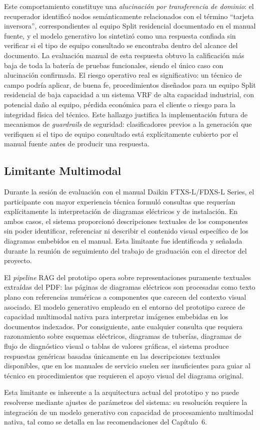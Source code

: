 {{Este comportamiento constituye una \textit{alucinación por transferencia de dominio}: el recuperador identificó nodos semánticamente relacionados con el término ``tarjeta inversora'', correspondientes al equipo Split residencial documentado en el manual fuente, y el modelo generativo los sintetizó como una respuesta confiada sin verificar si el tipo de equipo consultado se encontraba dentro del alcance del documento. La evaluación manual de esta respuesta obtuvo la calificación más baja de toda la batería de pruebas funcionales, siendo el único caso con alucinación confirmada. El riesgo operativo real es significativo: un técnico de campo podría aplicar, de buena fe, procedimientos diseñados para un equipo Split residencial de baja capacidad a un sistema VRF de alta capacidad industrial, con potencial daño al equipo, pérdida económica para el cliente o riesgo para la integridad física del técnico. Este hallazgo justifica la implementación futura de mecanismos de \textit{guardrails} de seguridad: clasificadores previos a la generación que verifiquen si el tipo de equipo consultado está explícitamente cubierto por el manual fuente antes de producir una respuesta.

\subsection{Limitante Multimodal}
\label{sec:limitante_multimodal}

Durante la sesión de evaluación con el manual Daikin FTXS-L/FDXS-L Series, el participante con mayor experiencia técnica formuló consultas que requerían explícitamente la interpretación de diagramas eléctricos y de instalación. En ambos casos, el sistema proporcionó descripciones textuales de los componentes sin poder identificar, referenciar ni describir el contenido visual específico de los diagramas embebidos en el manual. Esta limitante fue identificada y señalada durante la reunión de seguimiento del trabajo de graduación con el director del proyecto.

El \textit{pipeline} RAG del prototipo opera sobre representaciones puramente textuales extraídas del PDF: las páginas de diagramas eléctricos son procesadas como texto plano con referencias numéricas a componentes que carecen del contexto visual asociado. El modelo generativo empleado en el entorno del prototipo carece de capacidad multimodal nativa para interpretar imágenes embebidas en los documentos indexados. Por consiguiente, ante cualquier consulta que requiera razonamiento sobre esquemas eléctricos, diagramas de tuberías, diagramas de flujo de diagnóstico visual o tablas de valores gráficas, el sistema produce respuestas genéricas basadas únicamente en las descripciones textuales disponibles, que en los manuales de servicio suelen ser insuficientes para guiar al técnico en procedimientos que requieren el apoyo visual del diagrama original.

Esta limitante es inherente a la arquitectura actual del prototipo y no puede resolverse mediante ajustes de parámetros del sistema: su resolución requiere la integración de un modelo generativo con capacidad de procesamiento multimodal nativa, tal como se detalla en las recomendaciones del Capítulo~6.

}
}

